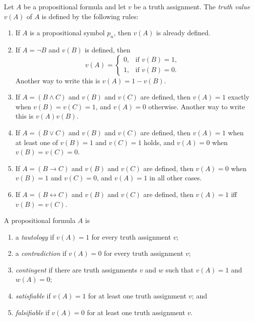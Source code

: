 \documentclass[11pt,a4paper]{amsart}
\begin{document}
\begin{definition}
  Let \(A\) be a propositional formula and let \(v\) be a truth assignment.
  The \emph{truth value} \(v(A)\) of \(A\) is defined by the following rules:
  \begin{enumerate}
    \item If \(A\) is a propositional symbol \(p_n\), then \(v(A)\) is already
      defined.
    \item If \(A=\neg B\) and \(v(B)\) is defined, then
      \[
        v(A)=
        \begin{cases}
          0, & \text{if }v(B)=1, \\
          1, & \text{if }v(B)=0.
        \end{cases}
      \]
      Another way to write this is \(v(A) = 1 - v(B)\).
    \item If \(A=(B\land C)\) and \(v(B)\) and \(v(C)\) are defined, then
      \(v(A)=1\) exactly when \(v(B)=v(C)=1\), and \(v(A)=0\) otherwise.
      Another way to write this is \(v(A)v(B)\).
    \item If \(A=(B\lor C)\) and \(v(B)\) and \(v(C)\) are defined, then
      \(v(A)=1\) when at least one of \(v(B)=1\) and \(v(C)=1\) holds, and
      \(v(A)=0\) when \(v(B)=v(C)=0\).
    \item If \(A=(B\rightarrow C)\) and \(v(B)\) and \(v(C)\) are defined,
      then \(v(A)=0\) when \(v(B)=1\) and \(v(C)=0\), and \(v(A)=1\) in all
      other cases.
    \item If \(A=(B\leftrightarrow C)\) and \(v(B)\) and \(v(C)\) are
      defined, then \(v(A)=1\) iff \(v(B)=v(C)\).
  \end{enumerate}
\end{definition}

\begin{definition}
  A propositional formula \(A\) is
  \begin{enumerate}
    \item a \emph{tautology} if \(v(A)=1\) for every truth assignment \(v\);
    \item a \emph{contradiction} if \(v(A)=0\) for every truth assignment
      \(v\);
    \item \emph{contingent} if there are truth assignments \(v\) and \(w\)
      such that \(v(A)=1\) and \(w(A)=0\);
    \item \emph{satisfiable} if \(v(A)=1\) for at least one truth assignment
      \(v\); and
    \item \emph{falsifiable} if \(v(A)=0\) for at least one truth assignment
      \(v\).
  \end{enumerate}
\end{definition}
\end{document}
